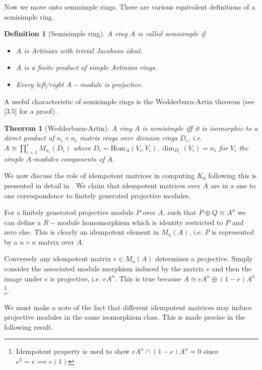 \documentclass[12pt]{report}
\numberwithin{equation}{section}
\newcommand{\Hom}{{\mathrm{Hom}}}
\newcounter{dummy} \numberwithin{dummy}{section}
\newtheorem{theorem}[dummy]{Theorem}
\newtheorem{definition}[dummy]{Definition}
\begin{document}
	
	Now we move onto semisimple rings. There are various equivalent definitions of a semisimple ring.
	\begin{definition}[Semisimple ring]
		A ring $A$ is called semisimple if
		\begin{itemize}
			\item $A$ is Artinian with trivial Jacobson ideal.
			\item $A$ is a finite product of simple Artinian rings.
			\item Every left/right $A-$module is projective.
		\end{itemize}
	\end{definition}
	
	A useful characteristic of semisimple rings is the Wedderburn-Artin theorem (see \cite{lam2001first}[3.5] for a proof).

	\begin{theorem}[Wedderburn-Artin]\label{wedart}
		A ring $A$ is semisimple iff it is isomorphic to a direct product of $n_i \times n_i$ matrix rings over division rings $D_i$, i.e. $A \cong \prod_{i=1}^r M_{n_i}(D_i)$ where $D_i =\Hom_A(V_i,V_i), \dim_{D_i}(V_i)=n_i$ for $V_i$ the simple $A$-modules components of $A$.
	\end{theorem}
	
	
	We now discuss the role of idempotent matrices in computing $K_0$ following \cite{weibel2013k} this is presented in detail in \cite{rosenberg1995algebraic}.
	We claim that idempotent matrices over $A$ are in a one to one correspondence to finitely generated projective modules. 
		
	For a finitely generated projective module $P$ over $A$, such that $P \oplus Q \cong A^n$ we can define a $R-$module homomorphism which is identity restricted to $P$ and zero else. This is clearly an idempotent element in $M_n(A)$, i.e. $P$ is represented by a $n\times n $ matrix over $A$.
	
	Conversely any idempotent matrix $e \in M_n(A)$ determines a projective. Simply consider the associated module morphism induced by the matrix $e$ and then the image under $e$ is projective, i.e. $eA^n$. This is true because $A \cong eA^n \oplus (1-e)A^n$ \footnote{Idempotent property is used to show $eA^n \cap (1-e)A^n = 0$ since $e^2=e\implies e(1)$}.
	
	We must make a note of the fact that different idempotent matrices may induce projective modules in the same isomorphism class. This is made precise in the following result.
	
\end{document}
